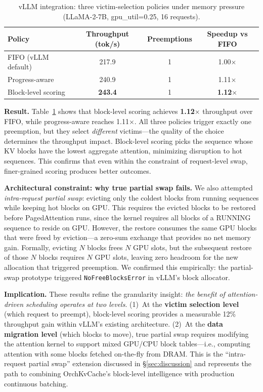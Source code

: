 \documentclass[conference]{IEEEtran}
\begin{document}
\begin{table}[t]
\centering
\caption{vLLM integration: three victim-selection policies under memory pressure (LLaMA-2-7B, gpu\_util=0.25, 16 requests).}
\label{tab:vllm-block}
\small
\begin{tabular}{@{}lccc@{}}
\toprule
Policy & Throughput (tok/s) & Preemptions & Speedup vs FIFO \\
\midrule
FIFO (vLLM default)   & 217.9 & 1 & 1.00$\times$ \\
Progress-aware        & 240.9 & 1 & 1.11$\times$ \\
Block-level scoring   & \textbf{243.4} & 1 & \textbf{1.12$\times$} \\
\bottomrule
\end{tabular}
\end{table}

\textbf{Result.} Table~\ref{tab:vllm-block} shows that block-level scoring achieves \textbf{1.12$\times$} throughput over FIFO, while progress-aware reaches 1.11$\times$. All three policies trigger exactly one preemption, but they select \emph{different} victims---the quality of the choice determines the throughput impact. Block-level scoring picks the sequence whose KV blocks have the lowest aggregate attention, minimizing disruption to hot sequences. This confirms that even within the constraint of request-level swap, finer-grained scoring produces better outcomes.

\textbf{Architectural constraint: why true partial swap fails.} We also attempted \emph{intra-request partial swap}: evicting only the coldest blocks from running sequences while keeping hot blocks on GPU. This requires the evicted blocks to be restored before PagedAttention runs, since the kernel requires all blocks of a RUNNING sequence to reside on GPU. However, the restore consumes the same GPU blocks that were freed by eviction---a zero-sum exchange that provides no net memory gain. Formally, evicting $N$ blocks frees $N$ GPU slots, but the subsequent restore of those $N$ blocks requires $N$ GPU slots, leaving zero headroom for the new allocation that triggered preemption. We confirmed this empirically: the partial-swap prototype triggered \texttt{NoFreeBlocksError} in vLLM's block allocator.

\textbf{Implication.} These results refine the granularity insight: \emph{the benefit of attention-driven scheduling operates at two levels}. (1)~At the \textbf{victim selection level} (which request to preempt), block-level scoring provides a measurable 12\% throughput gain within vLLM's existing architecture. (2)~At the \textbf{data migration level} (which blocks to move), true partial swap requires modifying the attention kernel to support mixed GPU/CPU block tables---i.e., computing attention with some blocks fetched on-the-fly from DRAM. This is the ``intra-request partial swap'' extension discussed in \S\ref{sec:discussion} and represents the path to combining OrchKvCache's block-level intelligence with production continuous batching.
\end{document}
